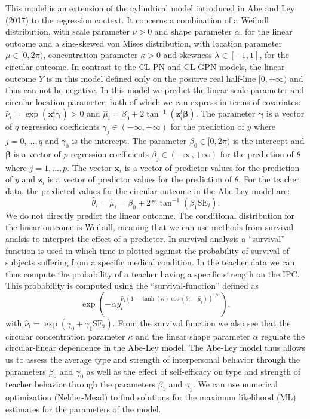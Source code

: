 \documentclass[man,mask]{apa6}
\begin{document}
This model is an extension of the cylindrical model introduced in
Abe and Ley (2017) to the regression context. It concerns a combination
of a Weibull distribution, with scale parameter \(\nu>0\) and shape parameter
\(\alpha\), for the linear outcome and a sine-skewed von Mises distribution,
with location parameter \(\mu\in [0, 2\pi)\), concentration parameter
\(\kappa>0\) and skewness \(\lambda \in [-1,1]\), for the circular outcome. In
contrast to the CL-PN and CL-GPN models, the linear outcome \(Y\) is in this
model defined only on the positive real half-line \([0, + \infty)\) and thus can
not be negative.\newline
\indent In this model we predict the linear scale parameter and circular
location parameter, both of which we can express in terms of
covariates: \(\hat{\nu}_i = \exp(\boldsymbol{x}_i^t\boldsymbol{\gamma}) > 0\) and
\(\hat{\mu}_i = \beta_0 + 2\tan^{-1}(\boldsymbol{z}_i^t\boldsymbol{\beta})\). The
parameter \(\boldsymbol{\gamma}\) is a vector of \(q\) regression coefficients
\(\gamma_j \in (-\infty, +\infty)\) for the prediction of \(y\) where \(j = 0, \dots, q\) and \(\gamma_0\) is the intercept. The parameter \(\beta_0 \in [0, 2\pi)\) is the intercept and \(\boldsymbol{\beta}\) is a vector of \(p\)
regression coefficients \(\beta_j \in (-\infty, +\infty)\) for the prediction of
\(\theta\) where \(j = 1, \dots, p\). The vector \(\boldsymbol{x}_i\) is a
vector of predictor values for the prediction of \(y\) and \(\boldsymbol{z}_i\)
is a vector of predictor values for the prediction of \(\theta\).\newline
\indent For the teacher data, the predicted values for the circular outcome in
the Abe-Ley model are: \[\hat{\theta}_{i} = \hat{\mu}_i = \beta_0 + 2 *
\tan^{-1}(\beta_1\text{SE}_i).\] We do not directly predict the linear outcome.
The conditional distribution for the linear outcome is Weibull, meaning that we
can use methods from survival analsis to interpret the effect of a predictor. In
survival analysis a \enquote{survival} function is used in which time is plotted against
the probability of survival of subjects suffering from a specific medical
condition. In the teacher data we can thus compute the probability of a teacher
having a specific strength on the IPC. This probability is computed using the
\enquote{survival-function} defined as \[\exp(-\alpha
y_i^{\hat{\nu}_i(1-\tanh(\kappa)\cos(\theta_i - \hat{\mu}_i))^{1/\alpha}}),\]
with \(\hat{\nu}_i = \exp(\gamma_0 + \gamma_1\mbox{SE}_i)\). From the survival
function we also see that the circular concentration parameter \(\kappa\) and
the linear shape parameter \(\alpha\) regulate the circular-linear dependence in
the Abe-Ley model. The Abe-Ley model thus allows us to assess the average type
and strength of interpersonal behavior through the parameters \(\beta_{0}\) and
\(\gamma_0\) as well as the effect of self-efficacy on type and strength of
teacher behavior through the parameters \(\beta_{1}\) and \(\gamma_1\).\newline
\indent We can use numerical optimization (Nelder-Mead) to find solutions for
the maximum likelihood (ML) estimates for the parameters of the model.
\end{document}
